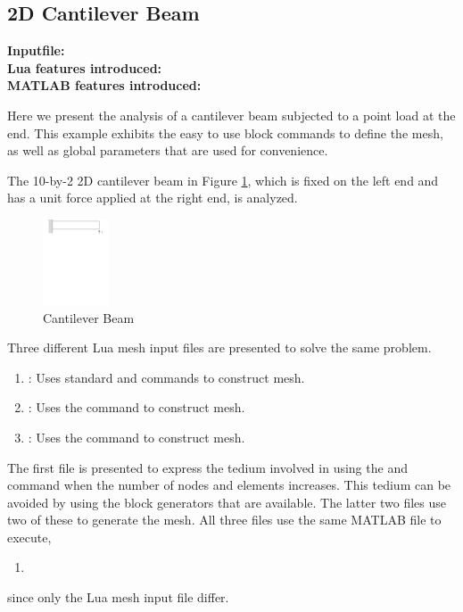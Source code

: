 \subsection{2D Cantilever Beam}
\begin{flushleft}
  \textbf{Inputfile:}
  \\
  \textbf{Lua features introduced:}
  \\
  \textbf{MATLAB features introduced:}
\end{flushleft}
Here we present the analysis of a cantilever beam subjected
to a point load at the end. This example exhibits
the easy to use block commands to define the mesh, as well as 
global parameters that are used for convenience. 

The 10-by-2 2D cantilever beam in Figure \ref{fig:CantileverBeam}, 
which is fixed on the left end and has a unit force applied at the 
right end, is analyzed. 
\begin{figure}[htbp]
  \centering
  \includegraphics[trim = 0mm 9in 0mm 0cm, clip, height=1in]{fig/cantileverbeam.pdf}
  \caption{Cantilever Beam}
  \label{fig:CantileverBeam}
\end{figure}

Three different Lua mesh input files are presented to solve 
the same problem.
\begin{enumerate}

  \item{}: Uses standard  and
   commands to construct mesh.

  \item{}: Uses the 
  command to construct mesh.

  \item{}: Uses the 
  command to construct mesh.

\end{enumerate}
The first file is presented to express the tedium involved in
using the  and  command when
the number of nodes and elements increases. This tedium can be 
avoided by using the block generators that are available. The
latter two files use two of these to generate the mesh. All
three files use the same MATLAB file to execute,
\begin{enumerate}
  \item{}
\end{enumerate}
since only the Lua mesh input file differ. 

